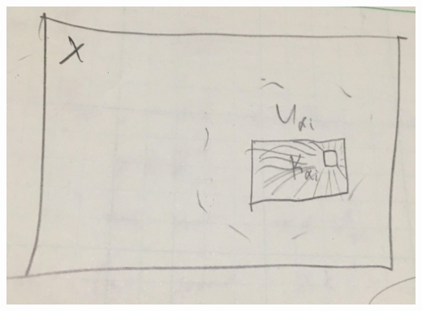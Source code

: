 \documentclass[letterpaper]{article}
\begin{document}
\begin{enumerate}
\begin{center}
\includegraphics[scale=.07]{hw9_prob5}
\end{center}


\end{enumerate}
\end{document}

